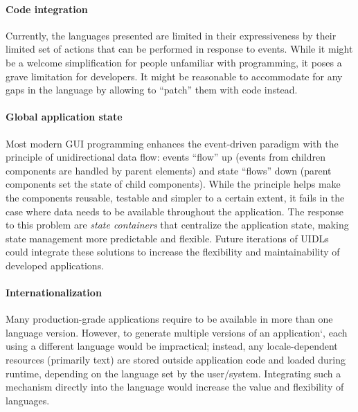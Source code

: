\paragraph{Code integration}
Currently, the languages presented are limited in their expressiveness by their limited set of actions that can be performed in response to events.
While it might be a welcome simplification for people unfamiliar with programming, it poses a grave limitation for developers.
It might be reasonable to accommodate for any gaps in the language by allowing to \enquote{patch} them with code instead.


\paragraph{Global application state}
Most modern GUI programming enhances the event-driven paradigm with the principle of unidirectional data flow: events \enquote{flow} up (events from children components are handled by parent elements) and state \enquote{flows} down (parent components set the state of child components).
While the principle helps make the components reusable, testable and simpler to a certain extent, it fails in the case where data needs to be available throughout the application.
The response to this problem are \emph{state containers} that centralize the application state, making state management more predictable and flexible.
Future iterations of UIDLs could integrate these solutions to increase the flexibility and maintainability of developed applications.

\paragraph{Internationalization}
Many production-grade applications require to be available in more than one language version.
However, to generate multiple versions of an application`, each using a different language would be impractical;
instead, any locale-dependent resources (primarily text) are stored outside application code and loaded during runtime, depending on the language set by the user/system.
Integrating such a mechanism directly into the language would increase the value and flexibility of languages.


